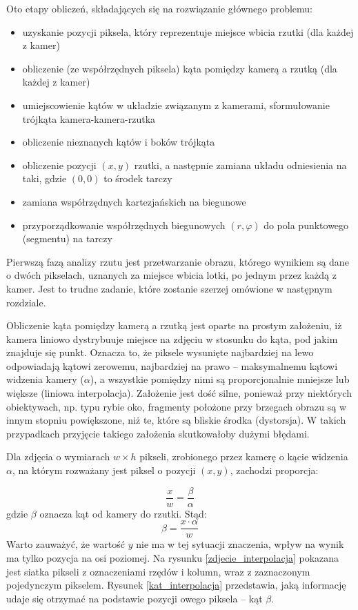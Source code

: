 Oto etapy obliczeń, składających się na rozwiązanie głównego problemu:
\begin{itemize}
  \item uzyskanie pozycji piksela, który reprezentuje miejsce wbicia rzutki (dla każdej z kamer)
  \item obliczenie (ze współrzędnych piksela) kąta pomiędzy kamerą a rzutką  (dla każdej z kamer)
  \item umiejscowienie kątów w układzie związanym z kamerami, sformułowanie trójkąta kamera-kamera-rzutka
  \item obliczenie nieznanych kątów i boków trójkąta
  \item obliczenie pozycji $(x, y)$ rzutki, a następnie zamiana układu odniesienia na taki, gdzie $(0, 0)$ to środek tarczy
  \item zamiana współrzędnych kartezjańskich na biegunowe
  \item przyporządkowanie współrzędnych biegunowych $(r, \varphi)$ do pola punktowego (segmentu) na tarczy
\end{itemize}


Pierwszą fazą analizy rzutu jest przetwarzanie obrazu, którego wynikiem są dane o dwóch pikselach, uznanych za miejsce wbicia lotki, po jednym przez każdą z kamer. Jest to trudne zadanie, które zostanie szerzej omówione w następnym rozdziale. 

Obliczenie kąta pomiędzy kamerą a rzutką jest oparte na prostym założeniu, iż kamera liniowo dystrybuuje miejsce na zdjęciu w stosunku do kąta, pod jakim znajduje się punkt. Oznacza to, że piksele wysunięte najbardziej na lewo odpowiadają kątowi zerowemu, najbardziej na prawo -- maksymalnemu kątowi widzenia kamery ($\alpha$), a wszystkie pomiędzy nimi są proporcjonalnie mniejsze lub większe (liniowa interpolacja). Założenie jest dość silne, ponieważ przy niektórych obiektywach, np. typu rybie oko, fragmenty położone przy brzegach obrazu są w innym stopniu powiększone, niż te, które są bliskie środka (dystorsja). W takich przypadkach przyjęcie takiego założenia skutkowałoby dużymi błędami. 

Dla zdjęcia o wymiarach $w \times h$ pikseli, zrobionego przez kamerę o kącie widzenia $\alpha$, na którym rozważany jest piksel o pozycji $(x, y)$, zachodzi proporcja:

$$
\frac{x}{w} = \frac{\beta}{\alpha}
$$ gdzie $\beta$ oznacza kąt od kamery do rzutki. 
Stąd:
$$
\beta = \frac{x \cdot \alpha}{w}
$$
Warto zauważyć, że wartość $y$ nie ma w tej sytuacji znaczenia, wpływ na wynik ma tylko pozycja na osi poziomej. Na rysunku \ref{zdjecie_interpolacja} pokazana jest siatka pikseli z oznaczeniami rzędów i kolumn, wraz z zaznaczonym pojedynczym pikselem. Rysunek \ref{kat_interpolacja} przedstawia, jaką informację udaje się otrzymać na podstawie pozycji owego piksela -- kąt $\beta$.



